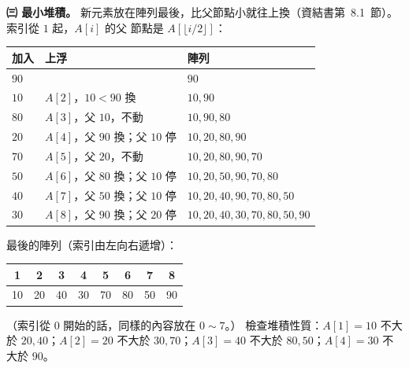 \begin{pastsoln}
\textbf{㈢ 最小堆積。} 新元素放在陣列最後，比父節點小就往上換（資結書第~8.1~節）。 索引從 $1$ 起，$A[i]$ 的父
節點是 $A[\lfloor i/2 \rfloor]$：
\begin{center}
\begin{tabular}{lll}
\toprule
加入 & 上浮 & 陣列 \\
\midrule
$90$ & & $90$ \\
$10$ & $A[2]$，$10 < 90$ 換 & $10, 90$ \\
$80$ & $A[3]$，父 $10$，不動 & $10, 90, 80$ \\
$20$ & $A[4]$，父 $90$ 換；父 $10$ 停 & $10, 20, 80, 90$ \\
$70$ & $A[5]$，父 $20$，不動 & $10, 20, 80, 90, 70$ \\
$50$ & $A[6]$，父 $80$ 換；父 $10$ 停 & $10, 20, 50, 90, 70, 80$ \\
$40$ & $A[7]$，父 $50$ 換；父 $10$ 停 & $10, 20, 40, 90, 70, 80, 50$ \\
$30$ & $A[8]$，父 $90$ 換；父 $20$ 停 & $10, 20, 40, 30, 70, 80, 50, 90$ \\
\bottomrule
\end{tabular}
\end{center}
最後的陣列（索引由左向右遞增）：
\begin{center}
\begin{tabular}{|c|c|c|c|c|c|c|c|}
\multicolumn{1}{c}{\scriptsize 1} & \multicolumn{1}{c}{\scriptsize 2} & \multicolumn{1}{c}{\scriptsize 3} &
\multicolumn{1}{c}{\scriptsize 4} & \multicolumn{1}{c}{\scriptsize 5} & \multicolumn{1}{c}{\scriptsize 6} &
\multicolumn{1}{c}{\scriptsize 7} & \multicolumn{1}{c}{\scriptsize 8} \\
\hline
10 & 20 & 40 & 30 & 70 & 80 & 50 & 90 \\
\hline
\end{tabular}
\end{center}
（索引從 $0$ 開始的話，同樣的內容放在 $0 \sim 7$。） 檢查堆積性質：$A[1] = 10$ 不大於 $20, 40$；$A[2] = 20$
不大於 $30, 70$；$A[3] = 40$ 不大於 $80, 50$；$A[4] = 30$ 不大於 $90$。
\end{pastsoln}
